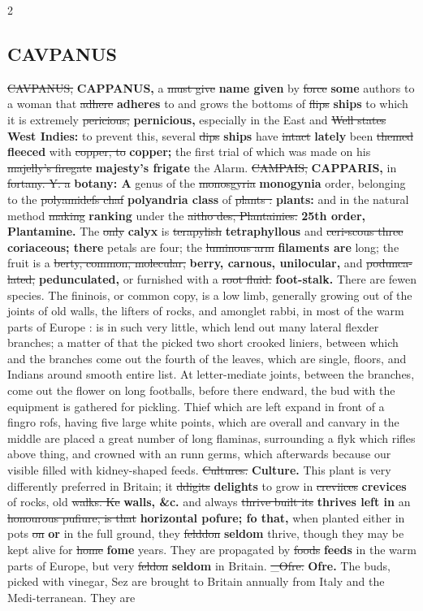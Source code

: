\documentclass[10pt]{article}
\begin{document}
\begin{multicols}{2}
\subsection*{CAVPANUS}
\sout{CAVPANUS,} \textbf{CAPPANUS,} a \sout{must give} \textbf{name given} by \sout{force} \textbf{some} authors to a woman that \sout{adhere} \textbf{adheres} to and grows the bottoms of \sout{flips} \textbf{ships} to which it is extremely \sout{pericious,} \textbf{pernicious,} especially in the East and \sout{Well states} \textbf{West Indies:} to prevent this, several \sout{dips} \textbf{ships} have \sout{intact} \textbf{lately} been \sout{themed} \textbf{fleeced} with \sout{copper, to} \textbf{copper;} the first trial of which was made on his \sout{majelly's firegate} \textbf{majesty's frigate} the Alarm. \sout{CAMPAIS,} \textbf{CAPPARIS,} in \sout{fortany. Y. a} \textbf{botany: A} genus of the \sout{monosgyria} \textbf{monogynia} order, belonging to the \sout{polyamidefs chaf} \textbf{polyandria class} of \sout{plants :} \textbf{plants:} and in the natural method \sout{making} \textbf{ranking} under the \sout{aitho des, Plantainies.} \textbf{25th order, Plantamine.} The \sout{only} \textbf{calyx} is \sout{terapylish} \textbf{tetraphyllous} and \sout{ceri-scous three} \textbf{coriaceous; there} petals are four; the \sout{luminous arm} \textbf{filaments are} long; the fruit is a \sout{berty, common, molecular,} \textbf{berry, carnous, unilocular,} and \sout{podunca-lated,} \textbf{pedunculated,} or furnished with a \sout{root fluid.} \textbf{foot-stalk.} There are fewen species. The fininois, or common copy, is a low limb, generally growing out of the joints of old walls, the lifters of rocks, and amonglet rabbi, in most of the warm parts of Europe : is in such very little, which lend out many lateral flexder branches; a matter of that the picked two short crooked liniers, between which and the branches come out the fourth of the leaves, which are single, floors, and Indians around smooth entire list. At letter-mediate joints, between the branches, come out the flower on long footballs, before there endward, the bud with the equipment is gathered for pickling. Thief which are left expand in front of a fingro rofs, having five large white points, which are overall and canvary in the middle are placed a great number of long flaminas, surrounding a flyk which rifles above thing, and crowned with an runn germs, which afterwards because our visible filled with kidney-shaped feeds. \sout{Cultures.} \textbf{Culture.} This plant is very differently preferred in Britain; it \sout{ddigits} \textbf{delights} to grow in \sout{creviices} \textbf{crevices} of rocks, old \sout{walks. Ke} \textbf{walls, \&c.} and always \sout{thrive built its} \textbf{thrives left in} an \sout{honourous pufiure, is that} \textbf{horizontal pofure; fo that,} when planted either in pots \sout{on} \textbf{or} in the full ground, they \sout{felddon} \textbf{seldom} thrive, though they may be kept alive for \sout{home} \textbf{fome} years. They are propagated by \sout{foods} \textbf{feeds} in the warm parts of Europe, but very \sout{feldon} \textbf{seldom} in Britain. \sout{\_Ofre.} \textbf{Ofre.} The buds, picked with vinegar, Sez are brought to Britain annually from Italy and the Medi-terranean. They are 
\end{multicols}
\end{document}
